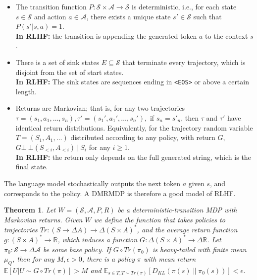 \documentclass{article}
\newtheorem{theorem}{Theorem}
\begin{document}
\begin{itemize}
\item
  The transition function
  \(P: \mathcal{S} \times \mathcal{A} \to \mathcal{S}\) is
  deterministic, i.e., for each state \(s \in \mathcal{S}\) and action
  \(a \in \mathcal{A}\), there exists a unique state
  \(s' \in \mathcal{S}\) such that \(P(s' | s, a) = 1\). \\ \textbf{In RLHF:} the transition is appending the generated token $a$ to the context $s$.
\item
  There is a set of sink states \(E \subseteq \mathcal S\) that
  terminate every trajectory, which is disjoint from the set of start
  states. \\ \textbf{In RLHF:} The sink states are sequences ending in \texttt{<EOS>} or above a certain length.
\item
  Returns are Markovian; that is, for any two trajectories
  \(\tau=(s_1, a_1, \dots, s_n), \tau'=(s_1', a_1', \dots, s_n'),\) if
  \(s_{n}= s'_{n}\), then \(\tau\) and \(\tau'\) have identical return
  distributions. Equivalently, for the trajectory random variable
  \(T=(S_1, A_1, \dots)\) distributed according to any policy, with
  return \(G\), \(G \bot\!\!\!\!\!\ \bot (S_{<i}, A_{<i}) \ |\ S_i\) for
  any \(i \ge 1\). \\ \textbf{In RLHF:} the return only depends on the full generated string, which is the final state.
\end{itemize}

The language model stochastically outputs the next token $a$ given $s$, and corresponds to the policy.
A DMRMDP is therefore a good model of RLHF.

\begin{theorem}
\label{thm3}
Let \(W = (\mathcal S, \mathcal A, P, R)\) be
a deterministic-transition MDP with Markovian returns. Given \(W\) we
define the function that takes policies to trajectories
\(Tr: (S \to \Delta A) \to \Delta(S \times A)^*\), and the average
return function \(g: (S \times A)^* \to \mathbb R\), which induces a
function \(G: \Delta(S \times A)^* \to \Delta \mathbb R\). Let
\(\pi_0: \mathcal S \to \Delta \mathcal A\) be some base policy. If
\(G \circ Tr(\pi_0)\) is heavy-tailed with finite mean \(\mu_Q\), then
for any \(M, \epsilon > 0\), there is a policy \(\pi\) with mean return
\(\mathbb E[U | U \sim G \circ Tr(\pi)] > M\) and
\(\mathbb E_{s \in T, T\sim Tr(\pi)}[D_{KL}(\pi(s) \| \pi_0(s))] < \epsilon\).
\end{theorem}
\end{document}
